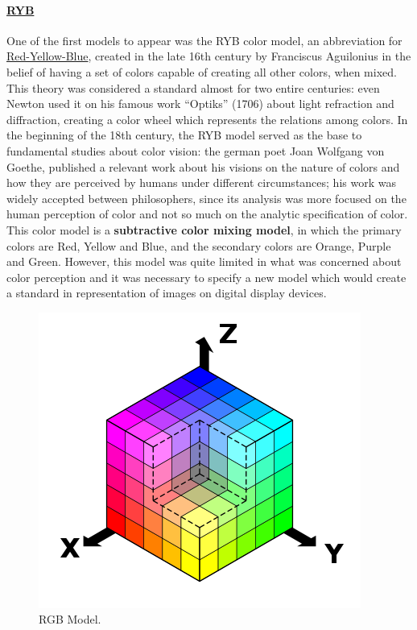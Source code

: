 \paragraph{\ul{RYB}} One of the first models to appear was the RYB color model, an
abbreviation for \ul{Red-Yellow-Blue}, created in the late 16th century by Franciscus Aguilonius
in the belief of having a set of colors capable of creating all other colors, when mixed. This theory
was considered a standard almost for two entire centuries: even Newton used it on his famous work
“Optiks” (1706) about light refraction and diffraction, creating a color wheel which represents the
relations among colors. In the beginning of the 18th century, the RYB
model served as the base to fundamental studies about color vision: the german poet Joan Wolfgang
von Goethe, published a relevant work about his visions on the nature of colors and how they are
perceived by humans under different circumstances; his work was widely accepted between philosophers,
since its analysis was more focused on the human perception of color and not so much on the analytic
specification of color. \\
This color model is a \textbf{subtractive color mixing model}, in which the primary colors are Red,
Yellow and Blue, and the secondary colors are Orange, Purple and Green. However, this model was quite
limited in what was concerned about color perception and it was necessary to specify a new model which
would create a standard in representation of images on digital display devices. \par
%
\begin{figure}
	\centering
	\vspace{-10pt}
	\includegraphics[width=\linewidth]{images/background/RGB.png}
	\caption[RGB Color Model Schematic]{RGB Model.\protect\footnotemark{}}
	\label{fig:RGB}
\end{figure}
%
